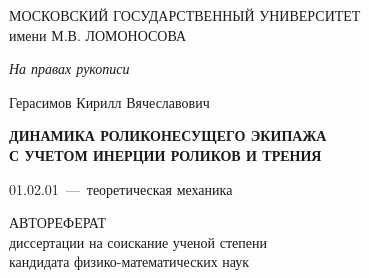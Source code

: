 \thispagestyle{empty}%
\begin{center}%
\MakeUppercase{Московский государственный университет}\\
имени \MakeUppercase{М.В. Ломоносова}\\
\end{center}%
%
\vspace{0pt plus4fill} %
\begin{flushright}%

\textit {На правах рукописи}

\end{flushright}%
%
\vspace{0pt plus6fill} %
\begin{center}%
{\large Герасимов Кирилл Вячеславович}
\end{center}%
%
\vspace{0pt plus1fill} %
\begin{center}%
\textbf{ДИНАМИКА РОЛИКОНЕСУЩЕГО ЭКИПАЖА \\ С УЧЕТОМ ИНЕРЦИИ РОЛИКОВ И ТРЕНИЯ}

 \vspace{0pt plus6fill} %
01.02.01~---~теоретическая механика

\vspace{0pt plus4fill} %
АВТОРЕФЕРАТ \\ диссертации на соискание ученой степени \\ кандидата физико-математических наук

\end{center}%
%
\vspace{0pt plus4fill} %


